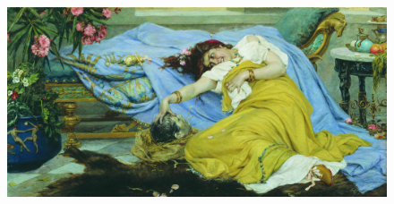 \begin{figure}[h!tb]
	\centering\includegraphics[scale=0.5]{holiday/159352470512026905.png}
	\label{fig:holid2} %
\end{figure}